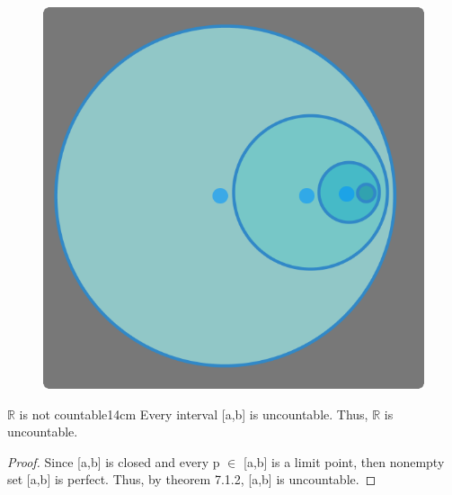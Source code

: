 	\begin{figure}[h]
		\centering
		\includegraphics[scale=0.3]{Images/7.1.2.png}
	\end{figure}



	\begin{corollary}{$\mathbb{R}$ is not countable}{14cm}
		Every interval [a,b] is uncountable.
		Thus, $\mathbb{R}$ is uncountable.
	\end{corollary}
	
	\begin{proof}
		Since [a,b] is closed and every p $\in$ [a,b] is a limit point,
		then nonempty set [a,b] is perfect.
		Thus, by {\color{red} theorem 7.1.2}, [a,b] is uncountable.
	\end{proof}

	\newpage



